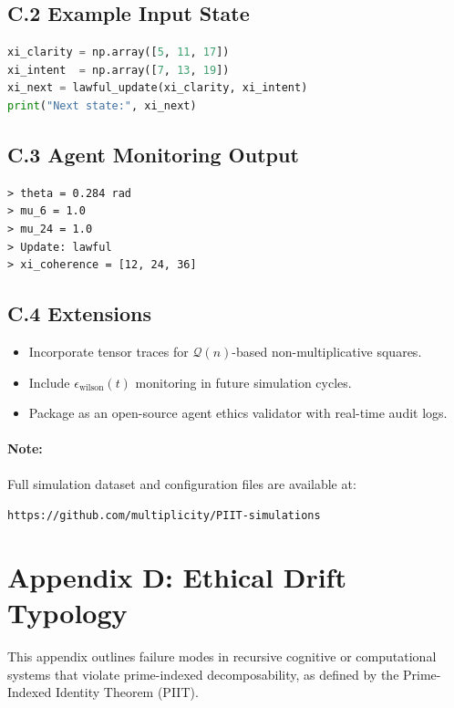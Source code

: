 \documentclass[12pt]{article}
\begin{document}
\subsection*{C.2 Example Input State}

\begin{lstlisting}[language=Python]
xi_clarity = np.array([5, 11, 17])
xi_intent  = np.array([7, 13, 19])
xi_next = lawful_update(xi_clarity, xi_intent)
print("Next state:", xi_next)
\end{lstlisting}

\subsection*{C.3 Agent Monitoring Output}

\begin{verbatim}
> theta = 0.284 rad
> mu_6 = 1.0
> mu_24 = 1.0
> Update: lawful
> xi_coherence = [12, 24, 36]
\end{verbatim}

\subsection*{C.4 Extensions}

\begin{itemize}
  \item Incorporate tensor traces for $\mathcal{Q}(n)$-based non-multiplicative squares.
  \item Include $\epsilon_{\text{wilson}}(t)$ monitoring in future simulation cycles.
  \item Package as an open-source agent ethics validator with real-time audit logs.
\end{itemize}

\paragraph{Note:} Full simulation dataset and configuration files are available at:

\texttt{https://github.com/multiplicity/PIIT-simulations}

\clearpage
\section*{Appendix D: Ethical Drift Typology}

This appendix outlines failure modes in recursive cognitive or computational systems that violate prime-indexed decomposability, as defined by the Prime-Indexed Identity Theorem (PIIT).
\end{document}
